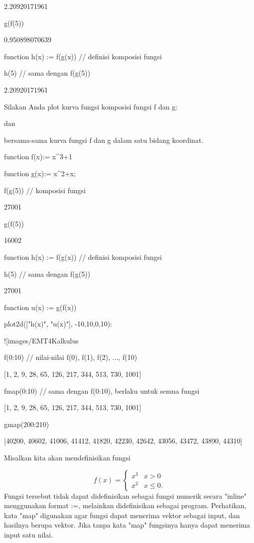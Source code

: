 \documentclass{article}
\begin{document}
    2.20920171961

\>g(f(5))


    0.950898070639

\>function h(x) := f(g(x)) // definisi komposisi fungsi 

\>h(5) // sama dengan f(g(5))


    2.20920171961

Silakan Anda plot kurva fungsi komposisi fungsi f dan g:


dan


bersama-sama kurva fungsi f dan g dalam satu bidang koordinat.


\>function f(x):= x^3+1

\>function g(x):= x^2+x;

\>f(g(5)) // komposisi fungsi


    27001

\>g(f(5))


    16002

\>function h(x) := f(g(x)) // definisi komposisi fungsi

\>h(5) // sama dengan f(g(5))


    27001

\>function u(x) := g(f(x))

\>plot2d(["h(x)", "u(x)"], -10,10,0,10):


![images/EMT4Kalkulus%

\>f(0:10) // nilai-nilai f(0), f(1), f(2), ..., f(10)


    [1,  2,  9,  28,  65,  126,  217,  344,  513,  730,  1001]

\>fmap(0:10) // sama dengan f(0:10), berlaku untuk semua fungsi


    [1,  2,  9,  28,  65,  126,  217,  344,  513,  730,  1001]

\>gmap(200:210)


    [40200,  40602,  41006,  41412,  41820,  42230,  42642,  43056,  43472,
    43890,  44310]

Misalkan kita akan mendefinisikan fungsi


$$f(x) = \begin{cases} x^3 & x>0 \\ x^2 & x\le 0. \end{cases}$$Fungsi tersebut tidak dapat didefinisikan sebagai fungsi numerik
secara "inline" menggunakan format :=, melainkan didefinisikan sebagai
program. Perhatikan, kata "map" digunakan agar fungsi dapat menerima
vektor sebagai input, dan hasilnya berupa vektor. Jika tanpa kata
"map" fungsinya hanya dapat menerima input satu nilai.
\end{document}
